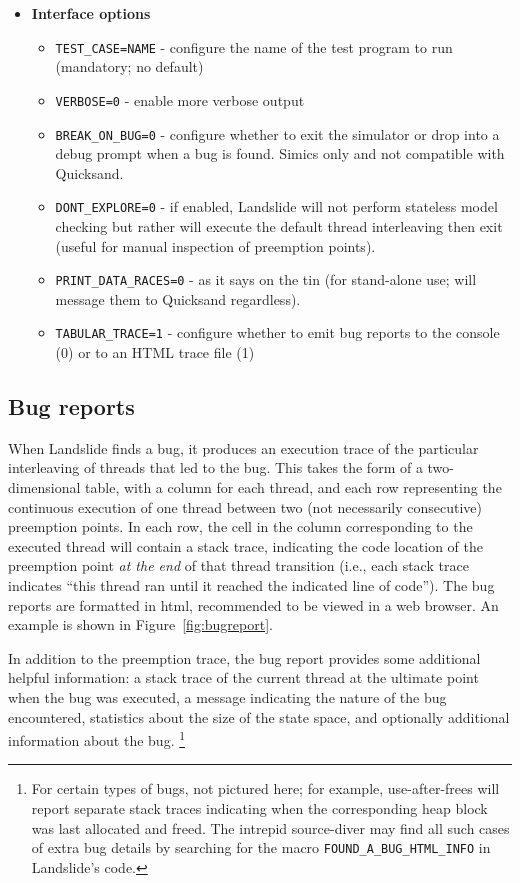 \begin{itemize}
\item {\bf Interface options}
\begin{itemize}
	\item {\tt TEST\_CASE=NAME} - configure the name of the test program to run (mandatory; no default)
	\item {\tt VERBOSE=0} - enable more verbose output
	\item {\tt BREAK\_ON\_BUG=0} - configure whether to exit the simulator or drop into a debug prompt when a bug is found. Simics only and not compatible with Quicksand.
	\item {\tt DONT\_EXPLORE=0} - if enabled, Landslide will not perform stateless model checking but rather will execute the default thread interleaving then exit (useful for manual inspection of preemption points).
	\item {\tt PRINT\_DATA\_RACES=0} - as it says on the tin (for stand-alone use; will message them to Quicksand regardless).
	\item {\tt TABULAR\_TRACE=1} - configure whether to emit bug reports to the console (0) or to an HTML trace file (1)
\end{itemize}
\end{itemize}


\subsection{Bug reports}
\label{sec:landslide-bugreport}

When Landslide finds a bug, it produces an execution trace of the particular interleaving of threads that led to the bug.
This takes the form of a two-dimensional table,
with a column for each thread,
and each row representing the continuous execution of one thread between two (not necessarily consecutive) preemption points.
In each row, the cell in the column corresponding to the executed thread will contain a stack trace,
indicating the code location of the preemption point {\em at the end} of that thread transition
(i.e., each stack trace indicates ``this thread ran until it reached the indicated line of code'').
The bug reports are formatted in html, recommended to be viewed in a web browser.
An example is shown in Figure~\ref{fig:bugreport}.

In addition to the preemption trace, the bug report provides some additional helpful information:
a stack trace of the current thread at the ultimate point when the bug was executed,
a message indicating the nature of the bug encountered,
statistics about the size of the state space,
and optionally additional information about the bug.%
\footnote{For certain types of bugs, not pictured here;
for example, use-after-frees will report separate stack traces
indicating when the corresponding heap block was last allocated and freed.
The intrepid source-diver may find all such cases of extra bug details
by searching for the macro {\tt FOUND\_A\_BUG\_HTML\_INFO} in Landslide's code.}

